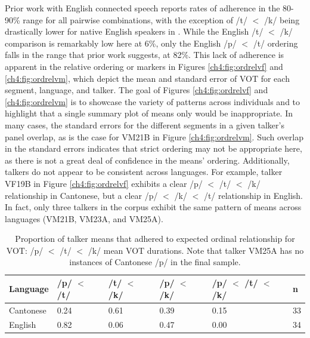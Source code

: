 Prior work with English connected speech reports rates of adherence in the 80-90\% range for all pairwise combinations, with the exception of /t/ $<$ /k/ being drastically lower for native English speakers in \citet{chodroff_2019_l2}. While the English /t/ $<$ /k/ comparison is remarkably low here at 6\%, only the English /p/ $<$ /t/ ordering falls in the range that prior work suggests, at 82\%. This lack of adherence is apparent in the relative ordering or markers in Figures \ref{ch4:fig:ordrelvf} and \ref{ch4:fig:ordrelvm}, which depict the mean and standard error of VOT for each segment, language, and talker. The goal of Figures \ref{ch4:fig:ordrelvf} and \ref{ch4:fig:ordrelvm} is to showcase the variety of patterns across individuals and to highlight that a single summary plot of means only would be inappropriate. In many cases, the standard errors for the different segments in a given talker's panel overlap, as is the case for VM21B in Figure \ref{ch4:fig:ordrelvm}. Such overlap in the standard errors indicates that strict ordering may not be appropriate here, as there is not a great deal of confidence in the means' ordering. Additionally, talkers do not appear to be consistent across languages. For example, talker VF19B in Figure \ref{ch4:fig:ordrelvf} exhibits a clear /p/ $<$ /t/ $<$ /k/ relationship in Cantonese, but a clear /p/ $<$ /k/ $<$ /t/ relationship in English. In fact, only three talkers in the corpus exhibit the same pattern of means across languages (VM21B, VM23A, and VM25A).

\begin{table}[hb!]
\caption{Proportion of talker means that adhered to expected ordinal relationship for VOT: /p/ $<$ /t/ $<$ /k/ mean VOT durations. Note that talker VM25A has no instances of Cantonese /p/ in the final sample.}
  \label{tab:ordrel}
  \centering
  \begin{tabular}{llllll}
    \toprule
    \textbf{Language} & \textbf{/p/ $<$ /t/} & \textbf{/t/ $<$ /k/} & \textbf{/p/ $<$ /k/} & \textbf{/p/ $<$ /t/ $<$ /k/} &  \textbf{n} \\
    \midrule 
    Cantonese   & 0.24  & 0.61  & 0.39  &  0.15 & 33 \\
    English     & 0.82  & 0.06  & 0.47  &  0.00  & 34 \\
    \bottomrule
  \end{tabular}
\end{table}

